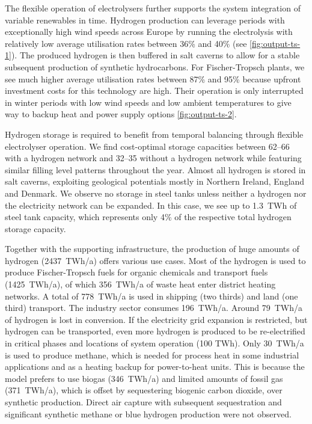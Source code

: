 
The flexible operation of electrolysers further supports the system integration
of variable renewables in time. Hydrogen production can leverage periods with
exceptionally high wind speeds across Europe by running the electrolysis with
relatively low average utilisation rates between 36\% and 40\% (see
\cref{fig:output-ts-1}). The produced hydrogen is then buffered in salt caverns
to allow for a stable subsequent production of synthetic hydrocarbons. For
Fischer-Tropsch plants, we see much higher average utilisation rates between
87\% and 95\% because upfront investment costs for this technology are high.
Their operation is only interrupted in winter periods with low wind speeds and
low ambient temperatures to give way to backup heat and power supply options
\cref{fig:output-ts-2}.


Hydrogen storage is required to benefit from temporal balancing through flexible
electrolyser operation. We find cost-optimal storage capacities between
\SIrange{62}{66}{\twh} with a hydrogen network and \SIrange{32}{35}{\twh}
without a hydrogen network while featuring similar filling level patterns
throughout the year. Almost all hydrogen is stored in salt caverns, exploiting
geological potentials mostly in Northern Ireland, England and Denmark. We
observe no storage in steel tanks unless neither a hydrogen nor the electricity
network can be expanded. In this case, we see up to 1.3~TWh of steel tank
capacity, which represents only 4\% of the respective total hydrogen storage
capacity.



Together with the supporting infrastructure, the production of huge amounts of
hydrogen (2437~TWh/a) offers various use cases. Most of the hydrogen is used to
produce Fischer-Tropsch fuels for organic chemicals and transport fuels
(1425~TWh/a), of which 356~TWh/a of waste heat enter district heating networks.
A total of 778~TWh/a is used in shipping (two thirds) and land (one third)
transport. The industry sector consumes 196~TWh/a. Around 79~TWh/a of hydrogen
is lost in conversion. If the electricity grid expansion is restricted, but
hydrogen can be transported, even more hydrogen is produced to be re-electrified
in critical phases and locations of system operation (100 TWh\el).
Only 30~TWh/a is used to produce methane, which is needed for process heat in
some industrial applications and as a heating backup for power-to-heat units.
This is because the model prefers to use biogas (346~TWh/a) and limited amounts
of fossil gas (371~TWh/a), which is offset by sequestering biogenic carbon
dioxide, over synthetic production. Direct air capture with subsequent
sequestration and significant synthetic methane or blue hydrogen production were
not observed.

